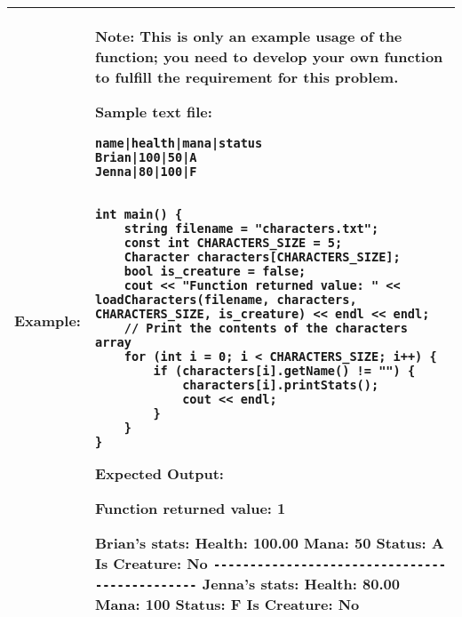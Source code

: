 \newpage
\begin{longtable}{|p{1.7in}|p{4.3in}|}
\hline
\textbf{Example:} & 
Note: This is only an example usage of the function; you need to develop your own function to fulfill the requirement for this problem.

\textbf{Sample text file:}

\begin{verbatim}
name|health|mana|status
Brian|100|50|A
Jenna|80|100|F 
\end{verbatim}

\vspace{5pt}

\begin{example}
\begin{verbatim}

int main() {
    string filename = "characters.txt";
    const int CHARACTERS_SIZE = 5;
    Character characters[CHARACTERS_SIZE];
    bool is_creature = false;
    cout << "Function returned value: " << loadCharacters(filename, characters, CHARACTERS_SIZE, is_creature) << endl << endl;
    // Print the contents of the characters array
    for (int i = 0; i < CHARACTERS_SIZE; i++) {
        if (characters[i].getName() != "") {
            characters[i].printStats();
            cout << endl;
        }
    }
}

\end{verbatim}
\end{example}

\textbf{Expected Output:} 

\vspace{5pt}
Function returned value: 1 \newline

Brian's stats: \newline
Health: 100.00 \newline
Mana: 50 \newline
Status: A \newline
Is Creature: No \newline
\noindent \verb|----------------------------------------------| \newline
Jenna's stats: \newline
Health: 80.00 \newline
Mana: 100 \newline
Status: F \newline
Is Creature: No
\vspace{5pt} \\ \hline

\end{longtable}



